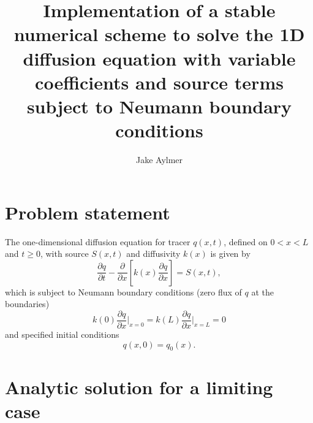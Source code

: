 \documentclass[12pt]{article}
\begin{document}
\thispagestyle{empty}

\title{Implementation of a stable numerical scheme to solve the 1D diffusion equation with variable coefficients and source terms subject to Neumann boundary conditions}
\author{Jake Aylmer}
\maketitle

\section{Problem statement}

The one-dimensional diffusion equation for tracer $q(x,t)$, defined on $0<x<L$ and $t\geq 0$, with source $S(x,t)$ and diffusivity $k(x)$ is given by
\begin{equation}\label{eq:diffusionequation}
\frac{\partial q}{\partial t} - \frac{\partial}{\partial x}\left[k(x)\frac{\partial q}{\partial x}\right] = S(x,t),
\end{equation}
which is subject to Neumann boundary conditions (zero flux of $q$ at the boundaries)
\begin{equation}\label{eq:boundaryconditions}
k(0)\frac{\partial q}{\partial x}\Bigr|_{x=0} = k(L)\frac{\partial q}{\partial x}\Bigr|_{x=L}= 0
\end{equation}
and specified initial conditions
\begin{equation}\label{eq:initialconditions}
q(x,0) = q_0(x).
\end{equation}

\section{Analytic solution for a limiting case}
\end{document}
